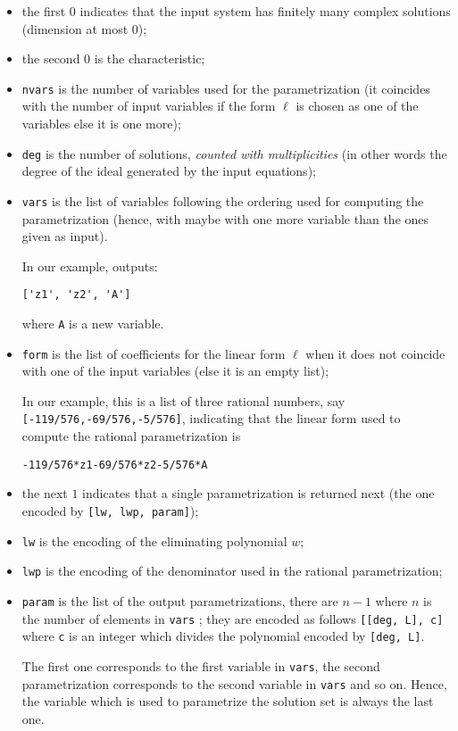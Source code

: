 \documentclass[a4paper,english,11pt]{scrartcl}
\theoremstyle{definition}
\theoremstyle{remark}
\begin{document}
\begin{itemize}
\item the first $0$ indicates that the input system has finitely
  many complex solutions (dimension at most $0$);
\item the second $0$ is the characteristic;
\item \verb+nvars+ is the number of variables used for the parametrization (it
  coincides with the number of input variables if the form $\ell$ is chosen
  as one of the variables else it is one more);
\item \verb+deg+ is the number of solutions, \emph{counted with multiplicities}
  (in other words the degree of the ideal generated by the input equations);
\item \verb+vars+ is the list of variables following the ordering used for
  computing the parametrization (hence, with maybe with one
  more variable than the ones given as input).

  In our example, \msolve outputs:
\begin{verbatim}
['z1', 'z2', 'A']
\end{verbatim}
where \verb+A+ is a new variable. 

\item \texttt{form} is the list of coefficients for the linear form $\ell$ when
  it does not coincide with one of the input variables (else it is an empty list);

  In our example, this is a list of three rational numbers,
  say \verb+[-119/576,-69/576,-5/576]+, 
  indicating that the linear form used to compute the rational parametrization is 
\begin{verbatim}
-119/576*z1-69/576*z2-5/576*A
\end{verbatim}
\item the next $1$ indicates that a single parametrization is returned next (the one encoded by \verb+[lw, lwp, param]+);
\item \verb+lw+ is the encoding of the eliminating polynomial $w$;
\item \verb+lwp+ is the encoding of the denominator used in the rational
  parametrization;
\item \verb+param+ is the list of the output parametrizations, there are $n-1$ where 
    $n$ is the number of elements in \verb+vars+ ; 
    they are encoded as follows \verb+[[deg, L], c]+ where \verb+c+ is 
    an integer which divides the polynomial encoded by \verb+[deg, L]+. 

    The first one corresponds to the first variable in \verb+vars+, the 
    second parametrization corresponds to the second variable in \verb+vars+ 
    and so on. Hence, the variable which is used to parametrize the solution 
    set is always the last one.
\end{itemize}
\end{document}
